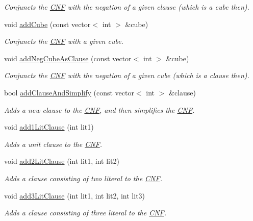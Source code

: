 \begin{DoxyCompactItemize}
\begin{DoxyCompactList}\small\item\em Conjuncts the \hyperlink{classCNF}{C\-N\-F} with the negation of a given clause (which is a cube then). \end{DoxyCompactList}\item 
void \hyperlink{classCNF_aa8621fad1a9a7b3022a79f5f735f5da2}{add\-Cube} (const vector$<$ int $>$ \&cube)
\begin{DoxyCompactList}\small\item\em Conjuncts the \hyperlink{classCNF}{C\-N\-F} with a given cube. \end{DoxyCompactList}\item 
void \hyperlink{classCNF_a84d01cd19e3032fb8d3bc7eaaaa40e34}{add\-Neg\-Cube\-As\-Clause} (const vector$<$ int $>$ \&cube)
\begin{DoxyCompactList}\small\item\em Conjuncts the \hyperlink{classCNF}{C\-N\-F} with the negation of a given cube (which is a clause then). \end{DoxyCompactList}\item 
bool \hyperlink{classCNF_a05caebe9e73a96d5f1050b3950434700}{add\-Clause\-And\-Simplify} (const vector$<$ int $>$ \&clause)
\begin{DoxyCompactList}\small\item\em Adds a new clause to the \hyperlink{classCNF}{C\-N\-F}, and then simplifies the \hyperlink{classCNF}{C\-N\-F}. \end{DoxyCompactList}\item 
void \hyperlink{classCNF_a8216b088c24fea1fd0cb1eecd16daabf}{add1\-Lit\-Clause} (int lit1)
\begin{DoxyCompactList}\small\item\em Adds a unit clause to the \hyperlink{classCNF}{C\-N\-F}. \end{DoxyCompactList}\item 
void \hyperlink{classCNF_adf7334d8029d4882cfb5ee21b01ac668}{add2\-Lit\-Clause} (int lit1, int lit2)
\begin{DoxyCompactList}\small\item\em Adds a clause consisting of two literal to the \hyperlink{classCNF}{C\-N\-F}. \end{DoxyCompactList}\item 
void \hyperlink{classCNF_a14154cae28b27dffc53239af7b39c4b4}{add3\-Lit\-Clause} (int lit1, int lit2, int lit3)
\begin{DoxyCompactList}\small\item\em Adds a clause consisting of three literal to the \hyperlink{classCNF}{C\-N\-F}. \end{DoxyCompactList}\item 

\end{DoxyCompactItemize}
